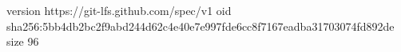 version https://git-lfs.github.com/spec/v1
oid sha256:5bb4db2bc2f9abd244d62c4e40e7e997fde6cc8f7167eadba31703074fd892de
size 96
